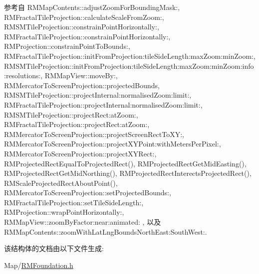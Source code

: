 参考自 R\-M\-Map\-Contents\-::adjust\-Zoom\-For\-Bounding\-Mask\-:, R\-M\-Fractal\-Tile\-Projection\-::calculate\-Scale\-From\-Zoom\-:, R\-M\-S\-M\-Tile\-Projection\-::constrain\-Point\-Horizontally\-:, R\-M\-Fractal\-Tile\-Projection\-::constrain\-Point\-Horizontally\-:, R\-M\-Projection\-::constrain\-Point\-To\-Bounds\-:, R\-M\-Fractal\-Tile\-Projection\-::init\-From\-Projection\-:tile\-Side\-Length\-:max\-Zoom\-:min\-Zoom\-:, R\-M\-S\-M\-Tile\-Projection\-::init\-From\-Projection\-:tile\-Side\-Length\-:max\-Zoom\-:min\-Zoom\-:info\-:resolutions\-:, R\-M\-Map\-View\-::move\-By\-:, R\-M\-Mercator\-To\-Screen\-Projection\-::projected\-Bounds, R\-M\-S\-M\-Tile\-Projection\-::project\-Internal\-:normalised\-Zoom\-:limit\-:, R\-M\-Fractal\-Tile\-Projection\-::project\-Internal\-:normalised\-Zoom\-:limit\-:, R\-M\-S\-M\-Tile\-Projection\-::project\-Rect\-:at\-Zoom\-:, R\-M\-Fractal\-Tile\-Projection\-::project\-Rect\-:at\-Zoom\-:, R\-M\-Mercator\-To\-Screen\-Projection\-::project\-Screen\-Rect\-To\-X\-Y\-:, R\-M\-Mercator\-To\-Screen\-Projection\-::project\-X\-Y\-Point\-:with\-Meters\-Per\-Pixel\-:, R\-M\-Mercator\-To\-Screen\-Projection\-::project\-X\-Y\-Rect\-:, R\-M\-Projected\-Rect\-Equal\-To\-Projected\-Rect(), R\-M\-Projected\-Rect\-Get\-Mid\-Easting(), R\-M\-Projected\-Rect\-Get\-Mid\-Northing(), R\-M\-Projected\-Rect\-Interects\-Projected\-Rect(), R\-M\-Scale\-Projected\-Rect\-About\-Point(), R\-M\-Mercator\-To\-Screen\-Projection\-::set\-Projected\-Bounds\-:, R\-M\-Fractal\-Tile\-Projection\-::set\-Tile\-Side\-Length\-:, R\-M\-Projection\-::wrap\-Point\-Horizontally\-:, R\-M\-Map\-View\-::zoom\-By\-Factor\-:near\-:animated\-: , 以及 R\-M\-Map\-Contents\-::zoom\-With\-Lat\-Lng\-Bounds\-North\-East\-:\-South\-West\-:.



该结构体的文档由以下文件生成\-:\begin{DoxyCompactItemize}
\item 
Map/\hyperlink{_r_m_foundation_8h}{R\-M\-Foundation.\-h}\end{DoxyCompactItemize}

